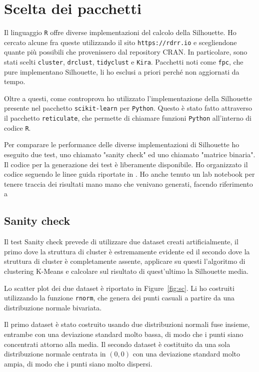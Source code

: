 \documentclass[italian]{article}
\begin{document}
	\section{Scelta dei pacchetti}

		Il linguaggio \texttt{R} offre diverse implementazioni del
		calcolo della Silhouette. Ho cercato alcune fra queste utilizzando
		il sito \texttt{https://rdrr.io} e scegliendone quante più possibili
		che provenissero dal repository CRAN. In particolare, sono stati
		scelti \texttt{cluster}, \texttt{drclust}, \texttt{tidyclust} e
		\texttt{Kira}. Pacchetti noti come \texttt{fpc}, che pure
		implementano Silhouette, li ho esclusi a priori perché non
		aggiornati da tempo.

		Oltre a questi, come controprova ho utilizzato l'implementazione
		della Silhouette presente nel pacchetto \texttt{scikit-learn} per
		\texttt{Python}. Questo è stato fatto attraverso il pacchetto
		\texttt{reticulate}, che permette di chiamare funzioni \texttt{Python}
		all'interno di codice \texttt{R}.

		Per comparare le performance delle diverse implementazioni di
		Silhouette ho eseguito due test, uno chiamato "sanity check" ed
		uno chiamato "matrice binaria". Il codice per la generazione dei
		test è liberamente disponibile. Ho organizzato il codice seguendo
		le linee guida riportate in \cite{10.1371/journal.pcbi.1000424}.
		Ho anche tenuto un lab notebook per tenere traccia dei risultati
		mano mano che venivano generati, facendo riferimento a \cite{10.1371/journal.pcbi.1004385}

		\subsection{Sanity check}

			Il test Sanity check prevede di utilizzare due dataset creati
			artificialmente, il primo dove la struttura di cluster è
			estremamente evidente ed il secondo dove la struttura di
			cluster è completamente assente, applicare su questi l'algoritmo
			di clustering K-Means e calcolare sul risultato di quest'ultimo
			la Silhouette media.

			Lo scatter plot dei due dataset è riportato in Figure~\ref{fig:sc}.
			Li ho costruiti utilizzando la funzione \texttt{rnorm}, che genera
			dei punti casuali a partire da una distribuzione normale bivariata.
			
			Il primo dataset è stato costruito usando due distribuzioni
			normali fuse insieme, entrambe con una deviazione standard
			molto bassa, di modo che i punti siano concentrati attorno
			alla media. Il secondo dataset è costituito da una sola distribuzione
			normale centrata in $(0, 0)$ con una deviazione standard molto ampia,
			di modo che i punti siano molto dispersi.
\end{document}
